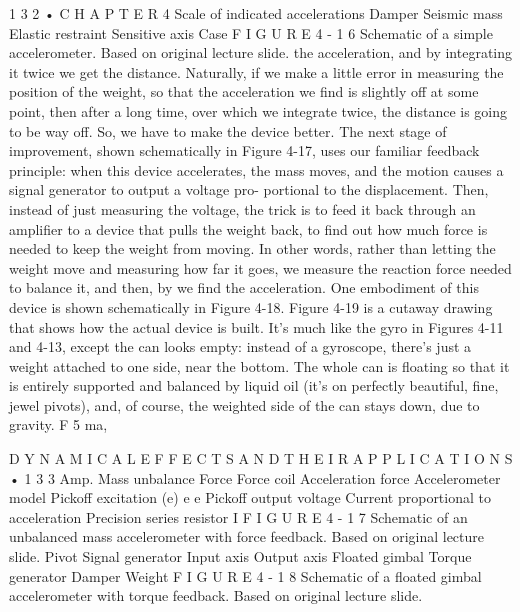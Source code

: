 \documentclass[10pt,oneside]{article}
\begin{document}
1 3 2 • C H A P T E R  4 Scale of indicated accelerations Damper Seismic mass Elastic restraint Sensitive axis Case F I G U R E  4 - 1 6 Schematic of a simple accelerometer. Based on original lecture slide. the acceleration, and by integrating it twice we get the distance. Naturally, if we make a little error in measuring the position of the weight, so that the acceleration we find is slightly off at some point, then after a long time, over which we integrate twice, the distance is going to be way off. So, we have to make the device better. The next stage of improvement, shown schematically in Figure 4-17, uses our familiar feedback principle: when this device accelerates, the mass moves, and the motion causes a signal generator to output a voltage pro- portional to the displacement. Then, instead of just measuring the voltage, the trick is to feed it back through an amplifier to a device that pulls the weight back, to find out how much force is needed to keep the weight from moving. In other words, rather than letting the weight move and measuring how far it goes, we measure the reaction force needed to balance it, and then, by we find the acceleration. One embodiment of this device is shown schematically in Figure 4-18. Figure 4-19 is a cutaway drawing that shows how the actual device is built. It’s much like the gyro in Figures 4-11 and 4-13, except the can looks empty: instead of a gyroscope, there’s just a weight attached to one side, near the bottom. The whole can is floating so that it is entirely supported and balanced by liquid oil (it’s on perfectly beautiful, fine, jewel pivots), and, of course, the weighted side of the can stays down, due to gravity. F 5 ma,\par

D Y N A M I C A L  E F F E C T S  A N D  T H E I R  A P P L I C A T I O N S • 1 3 3 Amp. Mass unbalance Force Force coil Acceleration force Accelerometer model Pickoff excitation (e) e e Pickoff output voltage Current proportional to acceleration Precision series resistor I F I G U R E  4 - 1 7 Schematic of an unbalanced mass accelerometer with force feedback. Based on original lecture slide. Pivot Signal generator Input axis Output axis Floated gimbal Torque generator Damper Weight F I G U R E  4 - 1 8 Schematic of a floated gimbal accelerometer with torque feedback. Based on original lecture slide.\par
\end{document}
